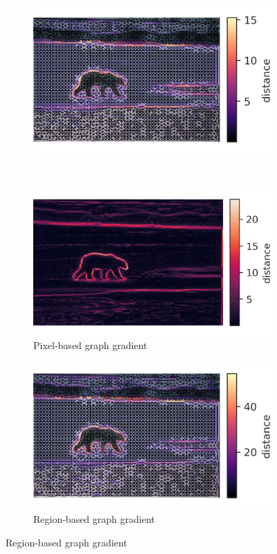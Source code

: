 \documentclass[journal]{IEEEtran}
\begin{document}
\begin{figure}[!ht]
\begin{subfigure}[b]{0.24\textwidth}
    \end{subfigure}   
    \begin{subfigure}[b]{0.24\textwidth}
        \includegraphics[width=\textwidth]{100007_weighted_ci_rag}
    \end{subfigure}\\ [1ex]          
    \begin{subfigure}[b]{0.24\textwidth}
        \includegraphics[width=\textwidth]{100007_pred_grad}
        \caption{Pixel-based graph gradient}
    \end{subfigure}   
    \begin{subfigure}[b]{0.24\textwidth}
        \includegraphics[width=\textwidth]{100007_weighted_pred}
        \caption{Region-based graph gradient}
    \end{subfigure}
    

\end{figure}
\end{document}
